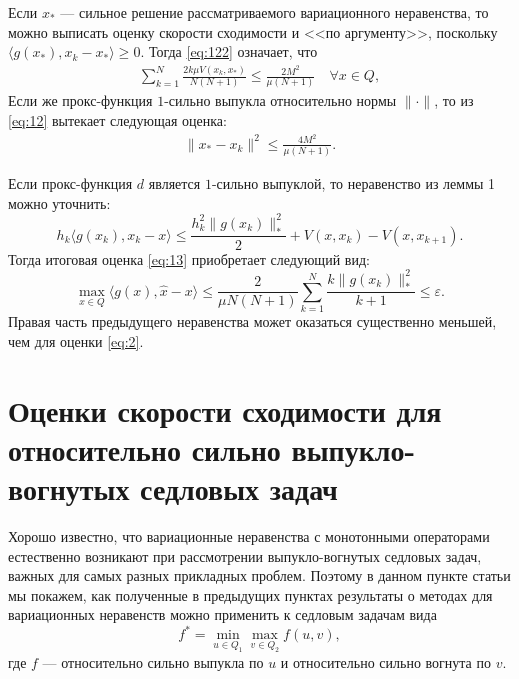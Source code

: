     \begin{remark}
        Если $x_*$ --- сильное решение рассматриваемого вариационного не\-равенства, то можно выписать оценку скорости сходимости и <<по аргументу>>, поскольку $\langle g(x_*), x_k - x_*\rangle \geq 0$. Тогда \eqref{eq:122} означает, что 
            \begin{equation} \label{eq:12}
            \begin{aligned} 
                \sum_{k=1}^{N} \frac{2k\mu V(x_k, x_*)}{N(N+1)} \leq \frac{2M^2}{\mu(N+1)} \quad  \forall x \in Q,
            \end{aligned}
            \end{equation}
        Если же прокс-функция $1$-сильно выпукла относительно нормы $\|\cdot\|$, то из \eqref{eq:12} вытекает следующая оценка:
            \begin{equation} 
            \begin{aligned} 
                \|x_* - x_k\|^2 \leq \frac{4M^2}{\mu(N+1)}.
            \end{aligned}
            \end{equation}
    \end{remark}
    \begin{remark} \label{remark4}
        Если прокс-функция $d$ является $1$-сильно выпуклой, то неравенство из леммы 1 можно уточнить:
        \begin{equation} \label{base_eq}
            h_k \langle g(x_k), x_k - x \rangle \leq \frac{h_k^2 \|g(x_k)\|_*^2}{2} + V(x, x_k) - V(x, x_{k+1}). 
        \end{equation}
        Тогда итоговая оценка \eqref{eq:13} приобретает следующий вид:
        \begin{equation}
            \max_{x \in Q} \langle g(x), \widehat{x} - x \rangle \leq \frac{2}{\mu N (N+1)} \sum_{k=1}^{N} \frac{k \|g(x_k)\|_*^2}{k+1} \leq \varepsilon.
        \end{equation}
        Правая часть предыдущего неравенства может оказаться существенно меньшей, чем для оценки \eqref{eq:2}.
    \end{remark}

\section{Оценки скорости сходимости для относительно сильно выпукло-вогнутых седловых задач} \label{sec:ch2/sec3}

    Хорошо известно, что вариационные неравенства с монотонными операторами естественно возникают при рассмотрении выпукло-вогнутых седловых задач, важных для самых разных прикладных проблем. Поэтому в данном пункте статьи мы покажем, как полученные в предыдущих пунктах результаты о методах для вариационных неравенств можно применить к седловым задачам вида
    \begin{equation}\label{eqsedlo}
        f^* = \min_{u \in Q_1} \max_{v \in Q_2} f(u, v),
    \end{equation}
    где $f$ --- относительно сильно выпукла по $u$ и относительно сильно вогнута по $v$.

